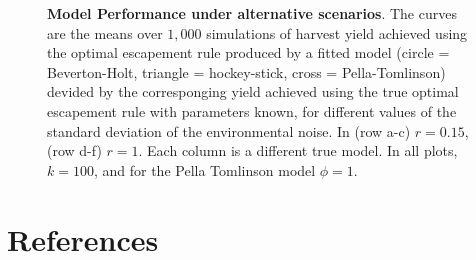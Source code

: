 \documentclass[]{elsarticle} %
\begin{document}
\begin{figure}[tb]
\begin{subfigure}[t]{0.3\textwidth}
			\end{subfigure}
	\caption{\textbf{Model Performance under alternative scenarios}. The curves are the means over $1,000$ simulations of harvest yield achieved using the optimal escapement rule produced by a fitted model (circle = Beverton-Holt, triangle = hockey-stick, cross = Pella-Tomlinson) devided by the corresponging yield achieved using the true optimal escapement rule with parameters known, for different values of the standard deviation of the environmental noise. In (row a-c) $r=0.15$, (row d-f) $r=1$. Each column is a different true model. In all plots, $k=100$, and for the Pella Tomlinson model $\phi = 1$.}\label{fig:ModelPerfVSig}
\end{figure}

\section*{References}\label{references}



\hypertarget{refs}{}
\end{document}
